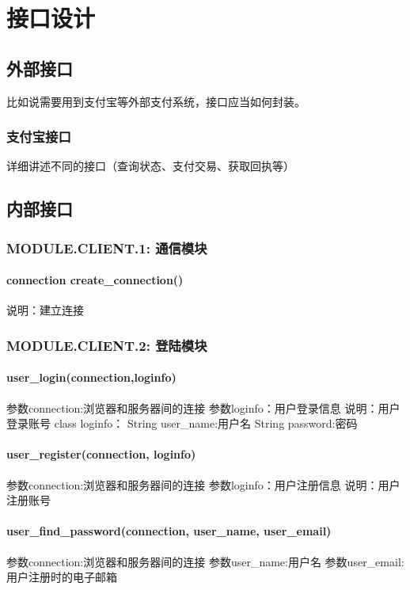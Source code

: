 \chapter{接口设计}
\section{外部接口}
比如说需要用到支付宝等外部支付系统，接口应当如何封装。

\subsection{支付宝接口}
详细讲述不同的接口（查询状态、支付交易、获取回执等）

\section{内部接口}

\subsection{MODULE.CLIENT.1: 通信模块}
\subsubsection{connection create_connection()}
说明：建立连接

\subsection{MODULE.CLIENT.2: 登陆模块}

\subsubsection{user_login(connection,loginfo)}
参数connection:浏览器和服务器间的连接
参数loginfo：用户登录信息
说明：用户登录账号
class loginfo：
String user_name:用户名
String password:密码
\subsubsection{user_register(connection, loginfo)}
参数connection:浏览器和服务器间的连接
参数loginfo：用户注册信息
说明：用户注册账号
\subsubsection{user_find_password(connection, user_name, user_email)}
参数connection:浏览器和服务器间的连接
参数user_name:用户名
参数user_email:用户注册时的电子邮箱

